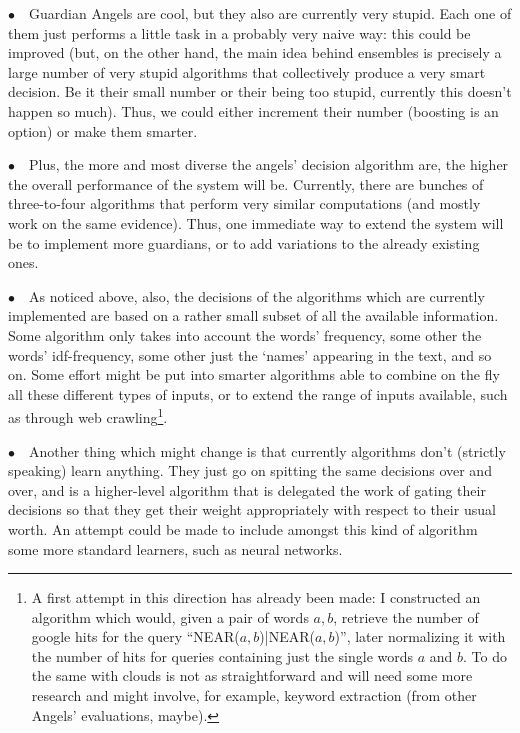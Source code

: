 \documentclass[11pt]{article}
\begin{document}
$\bullet \quad$Guardian Angels are cool, but they also are currently very stupid. Each one of them just performs a little task in a probably very naive way: this could be improved (but, on the other hand, the main idea behind ensembles is precisely a large number of very stupid algorithms that collectively produce a very smart decision. Be it their small number or their being too stupid, currently this doesn't happen so much). Thus, we could either increment their number (boosting is an option) or make them smarter.

$\bullet \quad$Plus, the more and most diverse the angels' decision algorithm are, the higher the overall performance of the system will be. Currently, there are bunches of three-to-four algorithms that perform very similar computations (and mostly work on the same evidence). Thus, one immediate way to extend the system will be to implement more guardians, or to add variations to the already existing ones.

$\bullet \quad$As noticed above, also, the decisions of the algorithms which are currently implemented are based on a rather small subset of all the available information. Some algorithm only takes into account the words' frequency, some other the words' idf-frequency, some other just the `names' appearing in the text, and so on. Some effort might be put into smarter algorithms able to combine on the fly all these different types of inputs, or to extend the range of inputs available, such as through web crawling\footnote{
A first attempt in this direction has already been made: I constructed an algorithm which would, given a pair of words $a,b$, retrieve the number of google hits for the query ``NEAR($a,b$)|NEAR($a,b$)'', later normalizing it with the number of hits for queries containing just the single words $a$ and $b$. To do the same with clouds is not as straightforward and will need some more research and might involve, for example, keyword extraction (from other Angels' evaluations, maybe).}.

$\bullet \quad$Another thing which might change is that currently algorithms don't (strictly speaking) learn anything. They just go on spitting the same decisions over and over, and is a higher-level algorithm that is delegated the work of gating their decisions so that they get their weight appropriately with respect to their usual worth. An attempt could be made to include amongst this kind of algorithm some more standard learners, such as neural networks.
\end{document}
